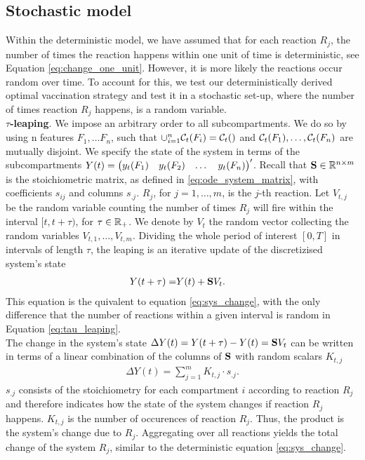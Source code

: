 \subsection{Stochastic model}
\label{sec:stochastic}
Within the deterministic model, we have assumed that for each reaction $R_j$, the number of times the reaction happens within one unit of time is deterministic, see Equation \eqref{eq:change_one_unit}. However, it is more likely the reactions occur random over time. To account for this, we test our deterministically derived optimal vaccination strategy and test it in a stochastic set-up, where the number of times reaction $R_j$ happens, is a random variable.  \\

\textbf{$\tau$-leaping}. We impose an arbitrary order to all subcompartments. We do so by using n features $F_1, \dots F_n$, such that $\cup_{i=1}^n \mathcal{C}_t(F_i) = \mathcal{C}_t()$ and $\mathcal{C}_t(F_1), \dots, \mathcal{C}_t(F_n)$ are mutually disjoint. We specify the state of the system in terms of the subcompartments $Y(t) = \begin{pmatrix} y_t(F_1) & y_t(F_2) & \dots & y_t(F_n)\end{pmatrix}'$. Recall that $\mathbf{S} \in \mathbb{R}^{n \times m}$ is the stoichiometric matrix, as defined in \eqref{eq:ode_system_matrix}, with coefficients $s_{ij}$ and columns $s_{.j}$. $R_j$, for $j=1, \dots, m$, is the $j$-th reaction. Let $V_{t,j}$ be the random variable counting the number of times $R_j$ will fire within the interval $[t, t + \tau)$, for $\tau \in \mathbb{R}_+$. We denote by $V_t$ the random vector collecting the random variables $V_{t,1}, \hdots, V_{t,m}$. Dividing the whole period of interest $[0, T]$ in intervals of length $\tau$, the leaping is an iterative update of the discretizised system's state
\begin{align}
\label{eq:tau_leaping}
Y(t + \tau) =& Y(t) + \mathbf{S} V_t.
\end{align}
This equation is the quivalent to equation \eqref{eq:sys_change}, with the only difference that the number of reactions within a given interval is random in Equation \eqref{eq:tau_leaping}. \\

The change in the system's state $\Delta Y(t) = Y(t + \tau) - Y(t)= \mathbf{S} V_t$ can be written in terms of a linear combination of the columns of $\mathbf{S}$ with random scalars $K_{t,j}$
\begin{align}
\Delta Y(t) = \sum_{j=1}^m K_{t,j} \cdot s_{.j}.
\end{align}
$s_{.j}$ consists of the stoichiometry for each compartment $i$ according to reaction $R_j$ and therefore indicates how the state of the system changes if reaction $R_j$ happens. $K_{t,j}$ is the number of occurences of reaction $R_j$. Thus, the product is the system's change due to $R_j$. Aggregating over all reactions yields the total change of the system $R_j$, similar to the deterministic equation \eqref{eq:sys_change}.\\  


